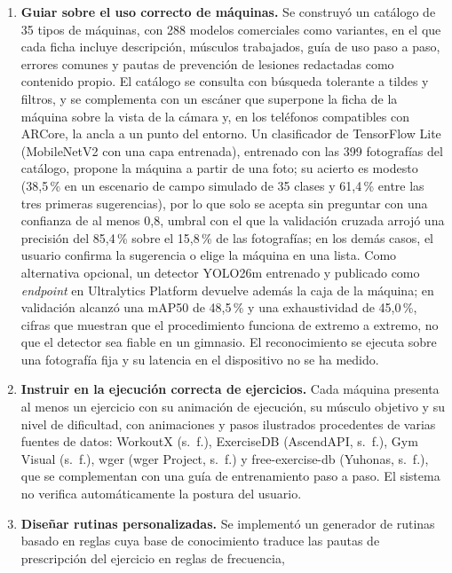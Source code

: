 \begin{enumerate}[label=\textbf{OE\arabic*.}, leftmargin=3.2em]
    \item \textbf{Guiar sobre el uso correcto de máquinas.} Se construyó un
    catálogo de 35 tipos de máquinas, con 288 modelos comerciales como
    variantes, en el que cada ficha incluye descripción, músculos trabajados,
    guía de uso paso a paso, errores comunes y pautas de prevención de
    lesiones redactadas como contenido propio. El catálogo se consulta con
    búsqueda tolerante a tildes y filtros, y se complementa con un escáner que
    superpone la ficha de la máquina sobre la vista de la cámara y, en los
    teléfonos compatibles con ARCore, la ancla a un punto del entorno. Un
    clasificador de TensorFlow Lite (MobileNetV2 con una capa entrenada),
    entrenado con las 399 fotografías del catálogo, propone la máquina a
    partir de una foto; su acierto es modesto (38,5\,\% en un escenario de
    campo simulado de 35 clases y 61,4\,\% entre las tres primeras
    sugerencias), por lo que solo se acepta sin preguntar con una confianza de
    al menos 0,8, umbral con el que la validación cruzada arrojó una precisión
    del 85,4\,\% sobre el 15,8\,\% de las fotografías; en los demás casos, el
    usuario confirma la sugerencia o elige la máquina en una lista. Como
    alternativa opcional, un detector YOLO26m entrenado y publicado como \emph{endpoint} en Ultralytics Platform devuelve además la caja de la máquina; en validación alcanzó una mAP50 de 48,5\,\% y una exhaustividad de 45,0\,\%, cifras que muestran que el procedimiento funciona de extremo a extremo, no que el detector sea fiable en un gimnasio. El reconocimiento se
    ejecuta sobre una fotografía fija y su latencia en el dispositivo no se ha
    medido.
    \item \textbf{Instruir en la ejecución correcta de ejercicios.} Cada
    máquina presenta al menos un ejercicio con su animación de ejecución, su
    músculo objetivo y su nivel de dificultad, con animaciones y pasos ilustrados procedentes de varias fuentes de datos: WorkoutX (s.~f.), ExerciseDB
    (AscendAPI, s.~f.), Gym Visual (s.~f.), wger (wger Project, s.~f.) y
    free-exercise-db (Yuhonas, s.~f.), que se
    complementan con una guía de entrenamiento paso a paso. El sistema no
    verifica automáticamente la postura del usuario.
    \item \textbf{Diseñar rutinas personalizadas.} Se implementó
    un generador de rutinas basado en reglas cuya base de conocimiento
    traduce las pautas de prescripción del ejercicio en reglas de frecuencia,

\end{enumerate}
